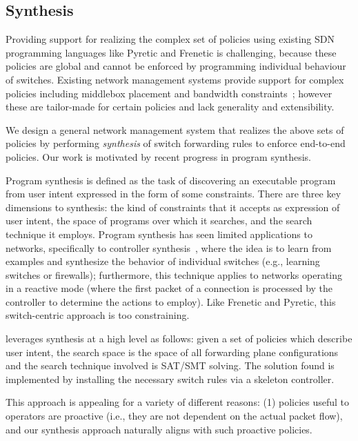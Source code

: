 \subsection{Synthesis} \label{sec:synthesis} 

Providing support for realizing the complex set of policies using
existing SDN programming languages like Pyretic and Frenetic is
challenging, because these policies are global and cannot be enforced
by programming individual behaviour of switches. Existing network
management systems provide support for complex policies including
middlebox placement and bandwidth constraints~\cite{}; however these
are tailor-made for certain policies and lack generality and
extensibility.

We design a general network management system that realizes the above
sets of policies by performing {\em synthesis} of switch forwarding
rules to enforce end-to-end policies. Our work is motivated by recent
progress in program synthesis. 

Program synthesis is defined as the task of discovering an executable
program from user intent expressed in the form of some
constraints. There are three key dimensions to synthesis: the kind of
constraints that it accepts as expression of user intent, the space of
programs over which it searches, and the search technique it
employs. Program synthesis has seen limited applications to networks,
specifically to controller synthesis~\cite{netegg}, where the idea is
to learn from examples and synthesize the behavior of individual
switches (e.g., learning switches or firewalls); furthermore, this
technique applies to networks operating in a reactive mode (where the
first packet of a connection is processed by the controller to
determine the actions to employ). Like Frenetic and Pyretic, this
switch-centric approach is too constraining.

\Name leverages synthesis at a high level as follows: given a set of
policies which describe user intent, the search space is the space of
all forwarding plane configurations and the search technique involved
is SAT/SMT solving. The solution found is implemented by installing
the necessary switch rules via a skeleton controller.

This approach is appealing for a variety of different reasons: (1)
policies useful to operators are proactive (i.e., they are not
dependent on the actual packet flow), and our synthesis approach
naturally aligns with such proactive policies.

